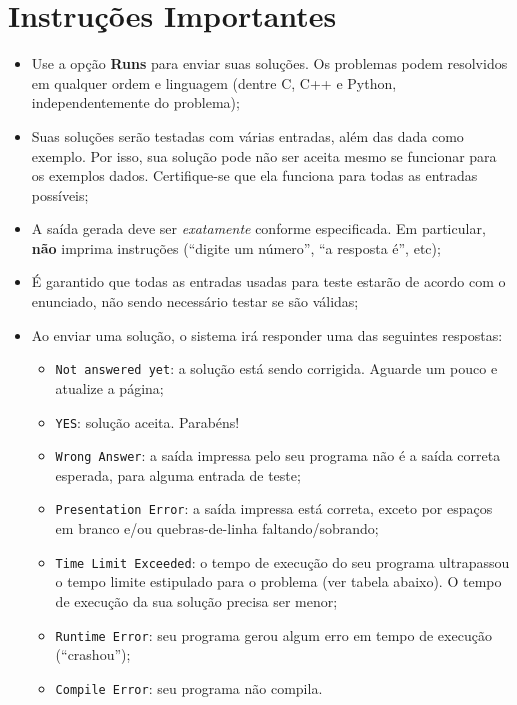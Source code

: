 \documentclass[12pt,oneside]{article} %
\begin{document}
\clearpage

\pagestyle{fancy}
\renewcommand{\footrulewidth}{0.7pt}
\renewcommand{\headrulewidth}{0.7pt}
\cfoot{\thepage}

\newpage

  \section*{Instruções Importantes}

\begin{itemize}

    \item Use a opção \textbf{Runs} para enviar suas soluções. Os problemas podem resolvidos em qualquer ordem e
    linguagem (dentre C, C++ e Python, independentemente do problema);

    \item Suas soluções serão testadas com várias entradas,
    além das dada como exemplo. Por isso, sua solução pode não ser
    aceita mesmo se funcionar para os exemplos dados. Certifique-se que ela
    funciona para todas as entradas possíveis;

    \item A saída gerada deve ser \textit{exatamente} conforme
    especificada. Em particular, \textbf{não} imprima instruções (``digite um
            número'', ``a resposta é'', etc);

    \item É garantido que todas as entradas usadas para teste estarão de acordo
    com o enunciado, não sendo necessário testar se são válidas;

    \item Ao enviar uma solução, o sistema irá responder uma das
    seguintes respostas:
    \begin{itemize}
        \item \verb|Not answered yet|: a solução está sendo corrigida.
        Aguarde um pouco e atualize a página;
        \item \verb|YES|: solução aceita. Parabéns!
        \item \verb|Wrong Answer|: a saída impressa pelo seu programa não é a
        saída correta esperada, para alguma entrada de teste;
        \item \verb|Presentation Error|: a saída impressa está correta, exceto
        por espaços em branco e/ou quebras-de-linha faltando/sobrando;
        \item \verb|Time Limit Exceeded|: o tempo de execução do seu programa
        ultrapassou o tempo limite estipulado para o problema (ver tabela
        abaixo). O tempo de execução da sua solução precisa ser menor;
        \item \verb|Runtime Error|: seu programa gerou algum erro em tempo de
        execução (``crashou'');
        \item \verb|Compile Error|: seu programa não compila.
    \end{itemize}


\end{itemize}
\end{document}
